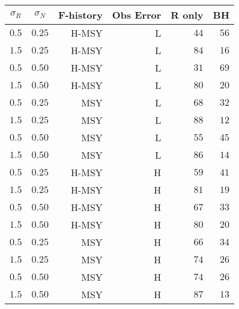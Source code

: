 \begin{center}
\begin{tabular}{rrrrrr}
\hline\hline
\multicolumn{1}{c}{$\sigma_R$}&\multicolumn{1}{c}{$\sigma_N$}&\multicolumn{1}{c}{F-history}&\multicolumn{1}{c}{Obs Error}&\multicolumn{1}{c}{R only}&\multicolumn{1}{c}{BH}\tabularnewline
\hline
$0.5$&$0.25$&H-MSY&L&$44$&$56$\tabularnewline
$1.5$&$0.25$&H-MSY&L&$84$&$16$\tabularnewline
$0.5$&$0.50$&H-MSY&L&$31$&$69$\tabularnewline
$1.5$&$0.50$&H-MSY&L&$80$&$20$\tabularnewline
$0.5$&$0.25$&MSY&L&$68$&$32$\tabularnewline
$1.5$&$0.25$&MSY&L&$88$&$12$\tabularnewline
$0.5$&$0.50$&MSY&L&$55$&$45$\tabularnewline
$1.5$&$0.50$&MSY&L&$86$&$14$\tabularnewline
$0.5$&$0.25$&H-MSY&H&$59$&$41$\tabularnewline
$1.5$&$0.25$&H-MSY&H&$81$&$19$\tabularnewline
$0.5$&$0.50$&H-MSY&H&$67$&$33$\tabularnewline
$1.5$&$0.50$&H-MSY&H&$80$&$20$\tabularnewline
$0.5$&$0.25$&MSY&H&$66$&$34$\tabularnewline
$1.5$&$0.25$&MSY&H&$74$&$26$\tabularnewline
$0.5$&$0.50$&MSY&H&$74$&$26$\tabularnewline
$1.5$&$0.50$&MSY&H&$87$&$13$\tabularnewline
\hline
\end{tabular}\end{center}
